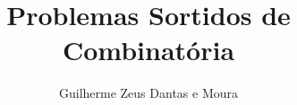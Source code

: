 \documentclass[11pt, a4paper]{article}
\title{Problemas Sortidos de Combinatória}
\author{Guilherme Zeus Dantas e Moura}
\begin{document}
	
	\zeustitle




    
\end{document}
